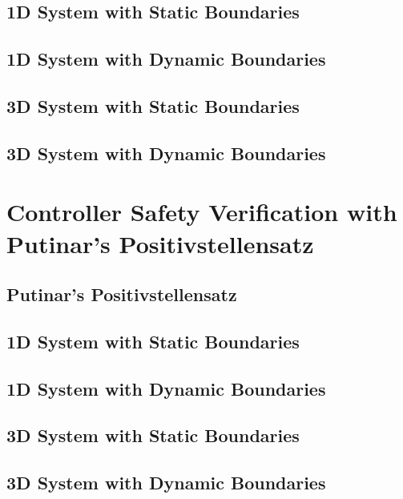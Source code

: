 \chapter{1D System with Static Boundaries}\label{chap:cbf_1d_static}

\chapter{1D System with Dynamic Boundaries} \label{chap:cbf_1d_dynamic}

\chapter{3D System with Static Boundaries}\label{chap:cbf_3d_static}

\chapter{3D System with Dynamic Boundaries} \label{chap:cbf_3d_dynamic}


\part[Controller Safety Verification with Putinar's Positivstellensatz]{Controller Safety Verification with \\Putinar's Positivstellensatz}\label{part:putinar}  %
\chapter{Putinar's Positivstellensatz}\label{chap:putinar}
	
\chapter{1D System with Static Boundaries}\label{chap:sos_1d_static}
	
\chapter{1D System with Dynamic Boundaries} \label{chap:sos_1d_dynamic}

\chapter{3D System with Static Boundaries}\label{chap:sos_3d_static}

\chapter{3D System with Dynamic Boundaries} \label{chap:sos_3d_dynamic}



